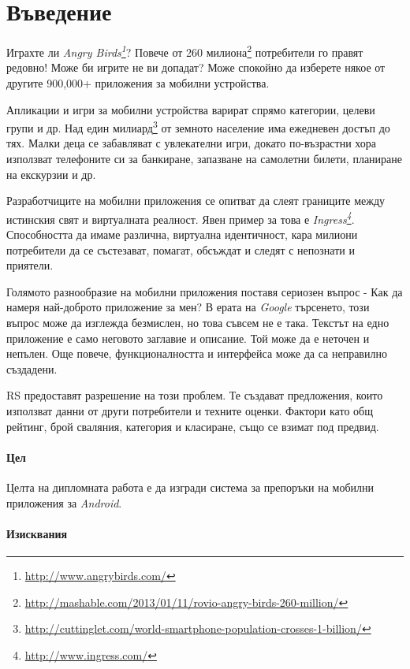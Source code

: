 \chapter*{Въведение}

	Играхте ли \emph{Angry Birds\footnote{\url{http://www.angrybirds.com/}}}? Повече от 260 милиона\footnote{\url{http://mashable.com/2013/01/11/rovio-angry-birds-260-million/}} потребители го правят редовно! Може би игрите не ви допадат? Може спокойно да изберете някое от другите 900,000+ приложения за мобилни устройства.
	
	Апликации и игри за мобилни устройства варират спрямо категории, целеви групи и др. Над един милиард\footnote{\url{http://cuttinglet.com/world-smartphone-population-crosses-1-billion/}} от земното население има ежедневен достъп до тях. Малки деца се забавляват с увлекателни игри, докато по-възрастни хора използват телефоните си за банкиране, запазване на самолетни билети, планиране на екскурзии и др.
	
	Разработчиците на мобилни приложения се опитват да слеят границите между истинския свят и виртуалната реалност. Явен пример за това е \emph{Ingress\footnote{\url{http://www.ingress.com/}}}. Способността да имаме различна, виртуална идентичност, кара милиони потребители да се състезават, помагат, обсъждат и следят с непознати и приятели.
	
	Голямото разнообразие на мобилни приложения поставя сериозен въпрос - Как да намеря най-доброто приложение за мен? В ерата на \emph{Google} търсенето, този въпрос може да изглежда безмислен, но това съвсем не е така. Текстът на едно приложение е само неговото заглавие и описание. Той може да е неточен и непълен. Още повече, функционалността и интерфейса може да са неправилно създадени.
	
	\ac{RS} предоставят разрешение на този проблем. Те създават предложения, които използват данни от други потребители и техните оценки. Фактори като общ рейтинг, брой сваляния, категория и класиране, също се взимат под предвид.

	\subsubsection{Цел}
	
		Целта на дипломната работа е да изгради система за препоръки на мобилни приложения за \emph{Android}.

	\subsubsection{Изисквания}

